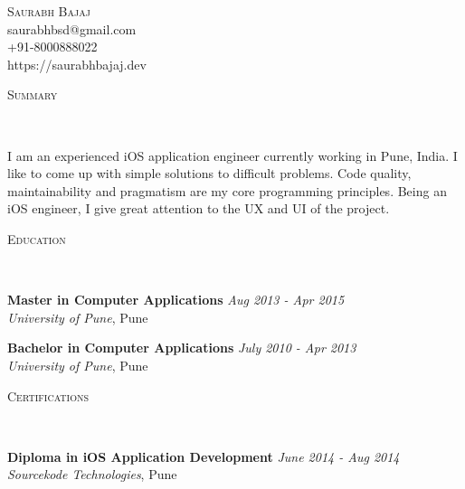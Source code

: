 \documentclass[9pt]{article}
\newenvironment{changemargin}[2]{%
  \begin{list}{}{%
    \setlength{\topsep}{0pt}%
    \setlength{\leftmargin}{#1}%
    \setlength{\rightmargin}{#2}%
    \setlength{\listparindent}{\parindent}%
    \setlength{\itemindent}{\parindent}%
    \setlength{\parsep}{\parskip}%
  }%
  \item[]}{\end{list}
}
\newcommand{\lineover}{
    \begin{changemargin}{-0.05in}{-0.05in}
        \vspace*{-8pt}
        \hrulefill \\
        \vspace*{-2pt}
    \end{changemargin}
}
\newcommand{\header}[1]{
    \begin{changemargin}{-0.5in}{-0.5in}
        \scshape{#1}\\
    \lineover
    \end{changemargin}
}
\newcommand{\contact}[4]{
    \begin{changemargin}{-0.5in}{-0.5in}
        \begin{center}
            {\Large \scshape {#1}}\\ \smallskip
            {#2}\\ \smallskip
            {#3}\\ \smallskip
            {#4}\smallskip
        \end{center}
    \end{changemargin}
}
\newenvironment{body} {
    \vspace*{-16pt}
    \begin{changemargin}{-0.25in}{-0.5in}
  }
    {\end{changemargin}
}
\begin{document}
\contact{Saurabh Bajaj}{saurabhbsd@gmail.com}{+91-8000888022}{https://saurabhbajaj.dev}


\header{Summary}

\begin{body}
    \vspace{14pt}
  I am an experienced iOS application engineer currently working in Pune, India. I like to come up with simple solutions to difficult problems. Code quality, maintainability and pragmatism are my core programming principles. Being an iOS engineer, I give great attention to the UX and UI of the project.

\end{body}

\smallskip


\header{Education}

\begin{body}
    \vspace{14pt}
    \textbf{Master in Computer Applications}{} \hfill \emph{Aug 2013 - Apr 2015}{} \\
    \emph{University of Pune}, Pune{} \\
\end{body}

\begin{body}
    \vspace{14pt}
    \textbf{Bachelor in Computer Applications}{} \hfill \emph{July 2010 - Apr 2013}{} \\
    \emph{University of Pune}, Pune{} \\
\end{body}

\smallskip


\header{Certifications}

\begin{body}
    \vspace{14pt}
    \textbf{Diploma in iOS Application Development}{} \hfill \emph{June 2014 - Aug 2014}{} \\
    \emph{Sourcekode Technologies}, Pune{} \\
\end{body}

\smallskip
\end{document}
